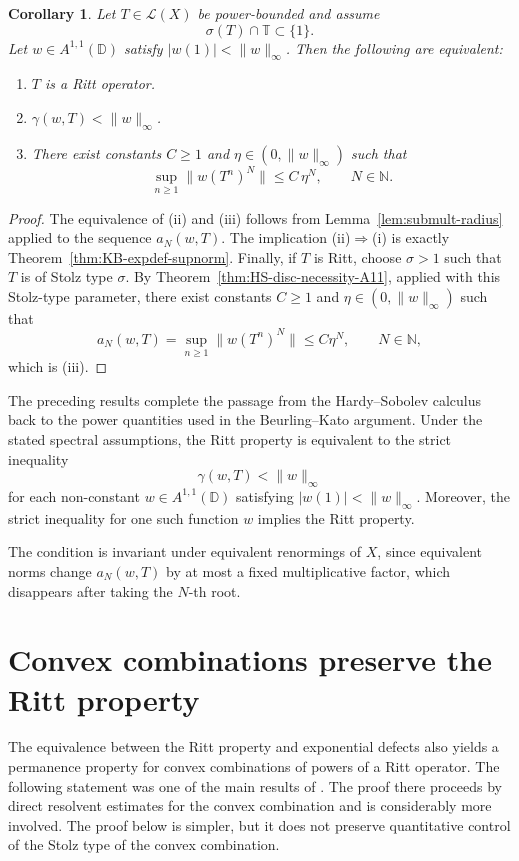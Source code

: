 \documentclass[11pt]{amsart}
\numberwithin{equation}{section}
\newtheorem{corollary}[theorem]{Corollary}
\theoremstyle{definition}
\theoremstyle{plain}
\def\N{\mathbb{N}}
\def\T{\mathbb{T}}
\def\L{L}
\def\D{\mathbb{D}}
\renewcommand{\L}{\mathcal L}
\begin{document}
\begin{corollary}
\label{cor:Ritt-iff-expdef-supnorm}
Let $T\in\L(X)$ be power-bounded and assume
\[
  \sigma(T)\cap\T\subset\{1\}.
\]
Let $w\in A^{1,1}(\D)$ satisfy $|w(1)|<\|w\|_\infty$.
Then the following are equivalent:
\begin{enumerate}
\item[(i)] $T$ is a Ritt operator.
\item[(ii)] $\gamma(w,T)<\|w\|_\infty$.
\item[(iii)] There exist constants $C\ge1$ and $\eta\in(0,\|w\|_\infty)$ such that
\[
   \sup_{n\ge1}\|w(T^n)^N\| \le C\,\eta^N, \qquad N\in\N.
\]
\end{enumerate}
\end{corollary}

\begin{proof}
The equivalence of (ii) and (iii) follows from Lemma~\ref{lem:submult-radius} applied
to the sequence $a_N(w,T)$. The implication (ii)$\Rightarrow$(i) is exactly
Theorem~\ref{thm:KB-expdef-supnorm}.
Finally, if \(T\) is Ritt, choose \(\sigma>1\) such that \(T\) is of Stolz type
\(\sigma\).
By Theorem~\ref{thm:HS-disc-necessity-A11}, applied with this
Stolz-type parameter, there exist constants $C\ge1$ and
$\eta\in(0,\|w\|_\infty)$ such that
\[
  a_N(w,T)=\sup_{n\ge1}\|w(T^n)^N\|\le C\eta^N, \qquad N\in\N,
\]
which is (iii).
\end{proof}

The preceding results complete the passage from the Hardy--Sobolev calculus
back to the power quantities used in the Beurling--Kato argument. Under the
stated spectral assumptions, the Ritt property is equivalent to
the strict inequality
\[
        \gamma(w,T)<\|w\|_\infty
\]
for each non-constant \(w\in A^{1,1}(\mathbb D)\) satisfying
\(|w(1)|<\|w\|_\infty\).  Moreover, the strict inequality for one such function $w$ implies the Ritt property. 

The condition is invariant under equivalent
renormings of \(X\), since equivalent norms change \(a_N(w,T)\) by at most
a fixed multiplicative factor, which disappears after taking the \(N\)-th
root.

\section{Convex combinations preserve the Ritt property}\label{S8x}

The equivalence between the Ritt property and exponential defects also yields
a permanence property for convex combinations of powers of a Ritt operator.
The following statement was one of the main results of \cite{GomTom-Indiana}.
The proof there proceeds by direct resolvent estimates for the convex
combination and is considerably more involved. The proof below is simpler,
but it does not preserve quantitative control of the Stolz type of the
convex combination.
\end{document}
